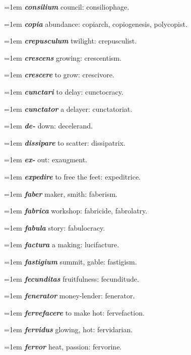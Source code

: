 \hangindent=1em \textbf{\textit{consilium}} council: consiliophage.\par
\hangindent=1em \textbf{\textit{copia}} abundance: copiarch, copiogenesis, polycopist.\par
\hangindent=1em \textbf{\textit{crepusculum}} twilight: crepusculist.\par
\hangindent=1em \textbf{\textit{crescens}} growing: crescentism.\par
\hangindent=1em \textbf{\textit{crescere}} to grow: crescivore.\par
\hangindent=1em \textbf{\textit{cunctari}} to delay: cunctocracy.\par
\hangindent=1em \textbf{\textit{cunctator}} a delayer: cunctatoriat.\par
\hangindent=1em \textbf{\textit{de-}} down: decelerand.\par
\hangindent=1em \textbf{\textit{dissipare}} to scatter: dissipatrix.\par
\hangindent=1em \textbf{\textit{ex-}} out: exaugment.\par
\hangindent=1em \textbf{\textit{expedire}} to free the feet: expeditrice.\par
\hangindent=1em \textbf{\textit{faber}} maker, smith: faberism.\par
\hangindent=1em \textbf{\textit{fabrica}} workshop: fabricide, fabrolatry.\par
\hangindent=1em \textbf{\textit{fabula}} story: fabulocracy.\par
\hangindent=1em \textbf{\textit{factura}} a making: lucifacture.\par
\hangindent=1em \textbf{\textit{fastigium}} summit, gable: fastigism.\par
\hangindent=1em \textbf{\textit{fecunditas}} fruitfulness: fecunditude.\par
\hangindent=1em \textbf{\textit{fenerator}} money-lender: fenerator.\par
\hangindent=1em \textbf{\textit{fervefacere}} to make hot: fervefaction.\par
\hangindent=1em \textbf{\textit{fervidus}} glowing, hot: fervidarian.\par
\hangindent=1em \textbf{\textit{fervor}} heat, passion: fervorine.\par
